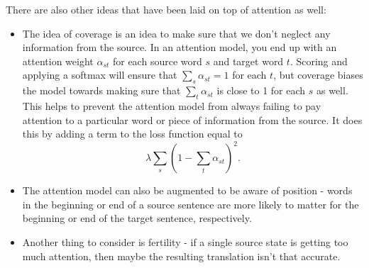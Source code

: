 There are also other ideas that have been laid on top of attention as well:
\begin{itemize}
\item The idea of coverage is an idea to make sure that we don't neglect any information from the source. In an attention model, you end up with an attention weight $\alpha_{st}$ for each source word $s$ and target word $t$. Scoring and applying a softmax will ensure that $\sum_s \alpha_{st} = 1$ for each $t$, but coverage biases the model towards making sure that $\sum_t \alpha_{st}$ is close to 1 for each $s$ as well. This helps to prevent the attention model from always failing to pay attention to a particular word or piece of information from the source. It does this by adding a term to the loss function equal to
$$\lambda \sum_{s} \left(1 - \sum_{t} \alpha_{st}\right)^2.$$
\item The attention model can also be augmented to be aware of position - words in the beginning or end of a source sentence are more likely to matter for the beginning or end of the target sentence, respectively.
\item Another thing to consider is fertility - if a single source state is getting too much attention, then maybe the resulting translation isn't that accurate.
\end{itemize}

